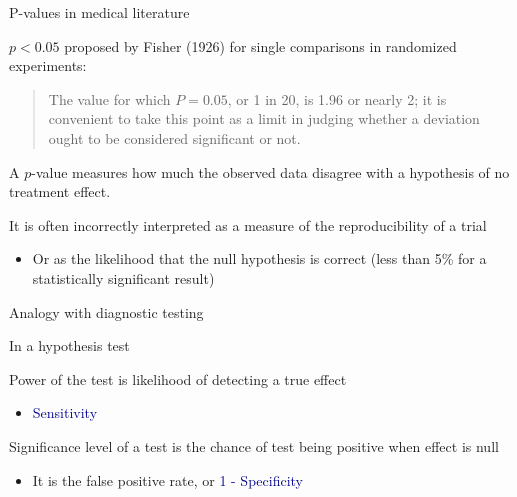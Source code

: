 \documentclass[ignorenonframetext,]{beamer}
\providecommand{\tightlist}{%
  \setlength{\itemsep}{0pt}\setlength{\parskip}{0pt}}
\begin{document}
\begin{frame}{P-values in medical literature}
\protect\hypertarget{p-values-in-medical-literature}{}

\(p < 0.05\) proposed by Fisher (1926) for single comparisons in
randomized experiments:

\begin{quote}

The value for which $P = 0.05$, or 1 in 20, is 1.96 or nearly 2; it is convenient to take this point as a limit in judging whether a deviation ought to be considered significant or not. 

\end{quote}

A \(p\)-value measures how much the observed data disagree with a
hypothesis of no treatment effect.

It is often incorrectly interpreted as a measure of the reproducibility
of a trial

\begin{itemize}
\tightlist
\item
  Or as the likelihood that the null hypothesis is correct (less than
  5\% for a statistically significant result)
\end{itemize}

\end{frame}

\begin{frame}{Analogy with diagnostic testing}
\protect\hypertarget{analogy-with-diagnostic-testing}{}

In a hypothesis test

Power of the test is likelihood of detecting a true effect

\begin{itemize}
\tightlist
\item
  \textcolor{darkblue}{Sensitivity}
\end{itemize}

Significance level of a test is the chance of test being positive when
effect is null

\begin{itemize}
\tightlist
\item
  It is the false positive rate, or
  \textcolor{darkblue}{1 - Specificity}
\end{itemize}

\end{frame}
\end{document}
